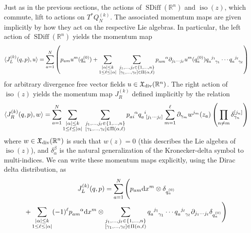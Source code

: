 \documentclass[12pt]{amsart}
\newcommand{\R}{\ensuremath{\mathbb{R}}}
\newcommand{\dx}{\ensuremath{\textrm{d}x}}
\DeclareMathOperator{\SDiff}{SDiff}
\DeclareMathOperator{\iso}{iso}
\begin{document}
  Just as in the previous sections, the actions of $\SDiff(\R^n)$ and $\iso(z)$, which commute, lift to actions on $T^*Q_N^{(k)}$.
  The associated momentum maps are given implicitly by how they act on the respective Lie algebras.
  In particular, the left action of $\SDiff(\R^n)$ yields the momentum map
  \begin{equation*}
  	\langle J_L^{(k)}(q,p) , u \rangle =
	\sum_{a=1}^N \left( p_{am} u^m(q^{(0)}_a) +
    \sum_{\substack{ |\alpha| \leq k \\ 1 \leq \ell \leq |\alpha| }} \;
		\sum_{
			\substack{
				j_1,\dots,j_\ell \in \{1,\dots,n\} \\
				[\gamma_1,\dots,\gamma_\ell] \in \Pi(\alpha,\ell)
				}
			}
			p\indices{_a_m^\alpha} \partial_{j_1 \cdots j_\ell}u^m (q^{(0)}_a)
      q\indices{_a^{j_1}_{\gamma_1}} \cdots
      q\indices{_a^{j_\ell}_{\gamma_\ell}}
			\right)
  \end{equation*}
  for arbitrary divergence free vector fields $u \in \mathfrak{X}_{\rm div}(\R^n)$.
  The right action of $\iso(z)$ yields the momentum map $J_R^{(k)}$ defined implicitly by the relation
  \begin{equation*}
    \langle J_R^{(k)}(q,p) , w \rangle = \sum_{a=1}^N
    \sum_{\substack{ |\alpha| \leq k \\ 1 \leq \ell \leq |\alpha| }} \;
		\sum_{
			\substack{
				j_1,\dots,j_\ell \in \{1,\dots,n\} \\
				[\gamma_1,\dots,\gamma_\ell] \in \Pi(\alpha,\ell)
				}
			}
			p\indices{_a_i^\alpha} q\indices{_a^{i}_{[j_1 \cdots j_\ell]}}
      \sum_{m=1}^\ell  \partial_{\gamma_m} w^{j_m}(z_a) \left( \prod_{n \neq m}  \delta_{\gamma_n}^{[j_n]} \right)
  \end{equation*}
  where $w \in \mathfrak{X}_{\rm div}(\R^n)$ is such that $w(z) = 0$ (this describes the Lie algebra of $\iso(z)$),
  and $\delta_\alpha^\beta$ is the natural generalization of the Kronecker-delta symbol to multi-indices.
  We can write these momentum maps explicitly, using the Dirac delta distribution, as
  \begin{multline*}
    J_L^{(k)}(q,p) =
    \sum_{a=1}^N \Bigg(
    p_{am} \dx^m \otimes \delta_{q^{(0)}_a} \\
  + \sum_{\substack{ |\alpha| \leq k \\ 1 \leq \ell \leq |\alpha| }}
    (-1)^\ell p\indices{_{am}^\alpha} \dx^m \otimes
      \sum_{\substack{
          j_1,\dots,j_\ell \in \{1,\dots,n\} \\
          [\gamma_1,\dots,\gamma_\ell] \in \Pi( \alpha,\ell)
          }
        }
      q\indices{_a^{j_1}_{\gamma_1}} \cdots q\indices{_a^{j_\ell}_{\gamma_\ell}}
      \partial_{j_1 \cdots j_\ell} \delta_{q^{(0)}_a}
      \Bigg)
  \end{multline*}
\end{document}
